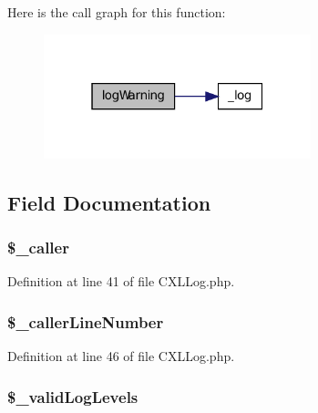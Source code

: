 Here is the call graph for this function:\nopagebreak
\begin{figure}[H]
\begin{center}
\leavevmode
\includegraphics[width=220pt]{classCXLLog_a4ca1d287757805ece6a3dc58feb89cdd_cgraph}
\end{center}
\end{figure}




\subsection{Field Documentation}
\hypertarget{classCXLLog_aa70290a86387975ab9608f6287417443}{
\subsubsection[{\$\_\-caller}]{\setlength{\rightskip}{0pt plus 5cm}\$\_\-caller}}
\label{classCXLLog_aa70290a86387975ab9608f6287417443}


Definition at line 41 of file CXLLog.php.

\hypertarget{classCXLLog_a14345e9f074575d9f774e70533a51264}{
\subsubsection[{\$\_\-callerLineNumber}]{\setlength{\rightskip}{0pt plus 5cm}\$\_\-callerLineNumber}}
\label{classCXLLog_a14345e9f074575d9f774e70533a51264}


Definition at line 46 of file CXLLog.php.

\hypertarget{classCXLLog_a939fa17840a3090aae1372c6c1cdb756}{
\subsubsection[{\$\_\-validLogLevels}]{\setlength{\rightskip}{0pt plus 5cm}\$\_\-validLogLevels}}
\label{classCXLLog_a939fa17840a3090aae1372c6c1cdb756}


